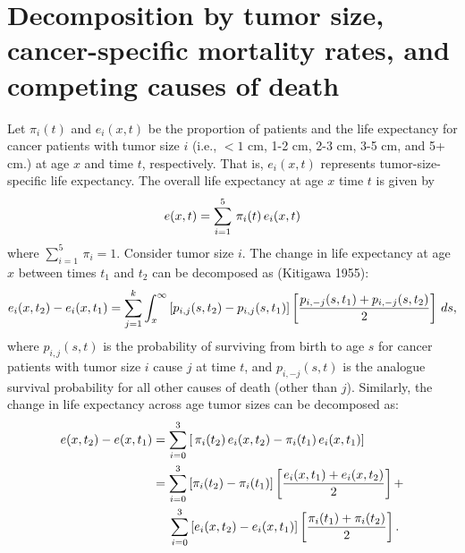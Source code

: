 \documentclass[12pt,letterpaper]{article}
\theoremstyle{plain}
\begin{document}
\newcommand{\hilight}[1]{\colorbox{yellow}{#1}}
\newcommand\ud{\mathrm{d}}
\newcommand\dist{\buildrel\rm d\over\sim}
\newcommand\ind{\stackrel{\rm indep.}{\sim}}
\newcommand\iid{\stackrel{\rm i.i.d.}{\sim}}
\newcommand\logit{{\rm logit}}
\renewcommand\r{\right}
\renewcommand\l{\left}
\newcommand\cA{\mathcal{A}}
\newcommand\alert{\textcolor{red}}
\newcommand\blue{\textcolor{blue}}
\newcommand\green{\textcolor{green}}
\newcommand\spacingset[1]{\renewcommand{\baselinestretch}%
{#1}\small\normalsize}
\spacingset{1}

\section{}
\label{sec:appendix} 
\label{subsec:appendix_decomp}

\section*{Decomposition by tumor size, cancer-specific mortality rates, and competing causes of death}

Let $\pi_i(t)$ and $e_i(x,t)$ be the proportion of patients and the
life expectancy for cancer patients with tumor size $i$ (i.e., $<1$
cm, 1-2 cm, 2-3 cm, 3-5 cm, and 5+ cm.) at age $x$ and time $t$,
respectively. That is, $e_i(x,t)$ represents tumor-size-specific life
expectancy. The overall life expectancy at age $x$ time $t$ is given
by
\begin{eqnarray}
  e(x,t)=\sum_{i=1}^{5}\,\pi_i(t)\,e_i(x,t) \notag
\end{eqnarray}
where $\sum_{i=1}^{5}\,\pi_i=1$.  Consider tumor size $i$.  The change
in life expectancy at age $x$ between times $t_1$ and $t_2$ can be
decomposed as (Kitigawa 1955): 
\begin{equation}
 e_i(x,t_2)-e_i(x,t_1) = \sum_{j=1}^k \int_x^\infty \left[ p_{i,j}(s,t_2)- p_{i,j}(s,t_1)\right] \left[ \frac{p_{i,-j}(s,t_1)+p_{i,-j}(s,t_2)}{2} \right]\,ds, \notag
\end{equation}
where $p_{i,j}(s,t)$ is the probability of surviving from birth to age
$s$ for cancer patients with tumor size $i$ cause $j$ at time $t$, and
$p_{i,-j}(s,t)$ is the analogue survival probability for all other
causes of death (other than $j$).  Similarly, the change in life
expectancy across age tumor sizes can be decomposed as: 
\begin{align*}
  e(x,t_2)-e(x,t_1)&=\sum_{i=0}^{3}\left[\,\pi_i(t_2)\,e_i(x,t_2)- \pi_i(t_1)\,e_i(x,t_1)\right] \notag \\
  &=\sum_{i=0}^{3}\left[\pi_i(t_2)-\pi_i(t_1)
  \right]\left[\frac{e_i(x,t_1)+e_i(x,t_2)}{2}\right]+\\
&\hspace{0.18in}\sum_{i=0}^{3}\left[e_i(x,t_2)-e_i(x,t_1) \right]\left[\frac{\pi_i(t_1)+\pi_i(t_2)}{2}\right]. \notag
\end{align*}
\end{document}
